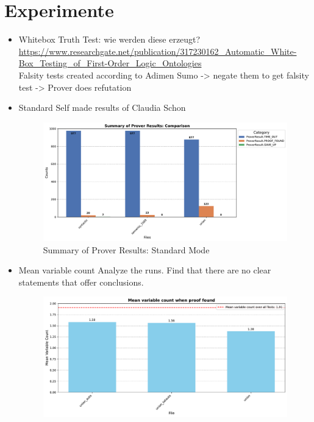\documentclass[german,version-2020-11]{uzl-thesis}
\begin{document}
\chapter{Experimente}
  \begin{itemize}
    \item Whitebox Truth Test: wie werden diese erzeugt? \\ 
    \url{https://www.researchgate.net/publication/317230162_Automatic_White-Box_Testing_of_First-Order_Logic_Ontologies} \\ 
    Falsity tests created according to Adimen Sumo -> negate them to get falsity test -> Prover does refutation
    \clearpage
    \item Standard
    Self made results of Claudia Schon
    \begin{figure}[h!]
      \centering
      \includegraphics[width=\textwidth]{standard_mode_noAdded_output.pdf} %
      \caption{Summary of Prover Results: Standard Mode}
      \label{fig:prover_results_standard}
    \end{figure}
    \clearpage
    \item Mean variable count
    Analyze the runs. Find that there are no clear statements that offer conclusions.
    \begin{figure}[h!]
      \centering
      \includegraphics[width=\textwidth]{variable_count.pdf} %

\end{figure}
\end{itemize}
\end{document}
